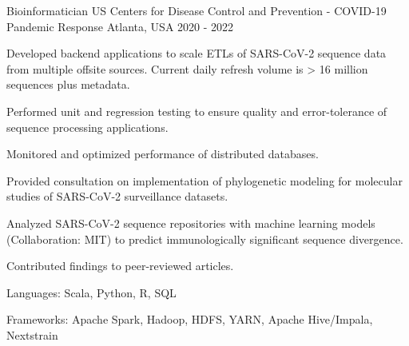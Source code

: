 \begin{cventries}
  \cventry
    {Bioinformatician} %
    {US Centers for Disease Control and Prevention - COVID-19 Pandemic Response} %
    {Atlanta, USA} %
    {2020 - 2022} %
    {
      \begin{cvitems} %
	\item {Developed backend applications to scale ETLs of SARS-CoV-2 sequence data from multiple offsite sources. Current daily refresh volume is > 16 million sequences plus metadata.}
        \item {Performed unit and regression testing to ensure quality and error-tolerance of sequence processing applications.}
	 \item {Monitored and optimized performance of distributed databases.}
        \item {Provided consultation on implementation of phylogenetic modeling for molecular studies of SARS-CoV-2 surveillance datasets.}
	\item {Analyzed SARS-CoV-2 sequence repositories with machine learning models (Collaboration: MIT) to predict immunologically significant sequence divergence.}
        \item {Contributed findings to peer-reviewed articles.}
        \item {Languages: Scala, Python, R, SQL}
	\item {Frameworks: Apache Spark, Hadoop, HDFS, YARN, Apache Hive/Impala, Nextstrain}
      \end{cvitems}
    }
  \vspace{2.0mm}
  
  
  
  \end{cventries}
